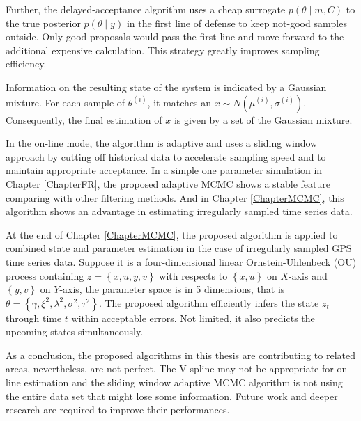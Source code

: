 Further, the delayed-acceptance algorithm uses a cheap surrogate $p(\theta\mid m, C)$ to the true posterior $p(\theta\mid y)$ in the first line of defense to keep not-good samples outside. Only good proposals would pass the first line and move forward to the additional expensive calculation. This strategy greatly improves sampling efficiency. 

Information on the resulting state of the system is indicated by a Gaussian mixture. For each sample of $\theta^{(i)}$, it matches an $x \sim N\left(\mu^{(i)},\sigma^{(i)}\right)$. Consequently, the final estimation of $x$ is given by a set of the Gaussian mixture. 

In the on-line mode, the algorithm is adaptive and uses a sliding window approach by cutting off historical data to accelerate sampling speed and to maintain appropriate acceptance. In a simple one parameter simulation in Chapter \ref{ChapterFR}, the proposed adaptive MCMC shows a stable feature comparing with other filtering methods. And in Chapter \ref{ChapterMCMC}, this algorithm shows an advantage in estimating irregularly sampled time series data. 

At the end of Chapter \ref{ChapterMCMC}, the proposed algorithm is applied to combined state and parameter estimation in the case of irregularly sampled GPS time series data. Suppose it is a four-dimensional linear Ornstein-Uhlenbeck (OU) process containing $z=\left\lbrace x,u,y,v\right\rbrace$ with respects to $\left\lbrace x,u\right\rbrace$ on $X$-axis and $\left\lbrace y,v\right\rbrace$ on $Y$-axis, the parameter space is in 5 dimensions, that is $\theta=\left\lbrace\gamma,\xi^2,\lambda^2,\sigma^2,\tau^2\right\rbrace$. The proposed algorithm efficiently infers the state $z_t$ through time $t$ within acceptable errors. Not limited, it also predicts the upcoming states simultaneously. 

As a conclusion, the proposed algorithms in this thesis are contributing to related areas, nevertheless, are not perfect. The V-spline may not be appropriate for on-line estimation and the sliding window adaptive MCMC algorithm is not using the entire data set that might lose some information. Future work and deeper research are required to improve their performances. 
